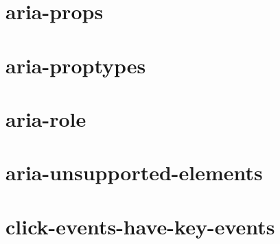 \documentclass[twoside]{book}
\newcommand{\+}{\discretionary{\mbox{\scriptsize$\hookleftarrow$}}{}{}}
\begin{document}
\chapter{aria-\/props}
\label{md__c_1_workspace_demo_src_main_script_node_modules_eslint-plugin-jsx-a11y_docs_rules_aria-props}

\chapter{aria-\/proptypes}
\label{md__c_1_workspace_demo_src_main_script_node_modules_eslint-plugin-jsx-a11y_docs_rules_aria-proptypes}

\chapter{aria-\/role}
\label{md__c_1_workspace_demo_src_main_script_node_modules_eslint-plugin-jsx-a11y_docs_rules_aria-role}

\chapter{aria-\/unsupported-\/elements}
\label{md__c_1_workspace_demo_src_main_script_node_modules_eslint-plugin-jsx-a11y_docs_rules_aria-unsupported-elements}

\chapter{click-\/events-\/have-\/key-\/events}
\label{md__c_1_workspace_demo_src_main_script_node_modules_eslint-plugin-jsx-a11y_docs_rules_click-events-have-key-events}

\end{document}
